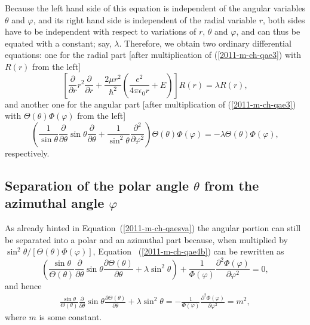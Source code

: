 Because the left hand side  of this equation is independent of the angular variables
$\theta $ and $\varphi$, and its right hand side  is independent of the radial variable $r$,
both sides have to be independent with respect to variations of $r$, $\theta $ and $\varphi$, and
can thus be equated with a constant;
say, $\lambda$.
Therefore, we obtain two ordinary
differential equations: one for the radial part [after multiplication of (\ref{2011-m-ch-qae3}) with $R(r)$ from the left]
\begin{equation}
\left[  \frac{\partial}{\partial r} r^2\frac{\partial}{\partial r}  +
\frac{2\mu r^2}{\hslash^2} \left(\frac{e^2}{4\pi \epsilon_0 r} + E \right) \right] R(r)
 =  \lambda  R( r )  ,
\label{2011-m-ch-qae4a}
\end{equation}
and another one for the angular part [after multiplication of (\ref{2011-m-ch-qae3}) with $\Theta(\theta)\Phi(\varphi)$ from the left]
\begin{equation}
\left(
\frac{1}{\sin \theta}   \frac{\partial}{\partial \theta }
\sin \theta \frac{\partial}{\partial \theta }
+
\frac{1}{\sin^2 \theta} \frac{\partial^2}{\partial \varphi^2 }
\right)
\Theta(\theta)\Phi(\varphi)   =  -  \lambda  \Theta(\theta)\Phi(\varphi),
\label{2011-m-ch-qae4b}
\end{equation}
respectively.


\subsection{Separation of the polar angle $\theta$ from the azimuthal angle $\varphi $}

As already hinted in Equation~(\ref{2011-m-ch-qaesva})
the angular portion can still be separated into a polar and an azimuthal
part
because, when multiplied by $\sin^2 \theta /[\Theta(\theta)\Phi(\varphi)]$,
Equation~  (\ref{2011-m-ch-qae4b})
can be rewritten as
\begin{equation}
\left(
\frac{\sin \theta}{\Theta(\theta)}
\frac{\partial}{\partial \theta }
\sin \theta \frac{\partial \Theta(\theta)}{\partial \theta }
+  \lambda  \sin^2 \theta   \right)
+
\frac{1}{\Phi(\varphi)} \frac{\partial^2\Phi(\varphi)}{\partial \varphi^2 }
= 0,
\label{2011-m-ch-qae4bc}
\end{equation}
and hence
\begin{equation}
\begin{split}
\frac{\sin \theta}{\Theta(\theta)}
\frac{\partial}{\partial \theta }
\sin \theta \frac{\partial \Theta(\theta)}{\partial \theta }
+  \lambda  \sin^2 \theta
  = -
\frac{1}{\Phi(\varphi)} \frac{\partial^2\Phi(\varphi)}{\partial \varphi^2 }
=  m^2,
\end{split}
\label{2011-m-ch-qae8}
\end{equation}
where $m$ is some constant.

